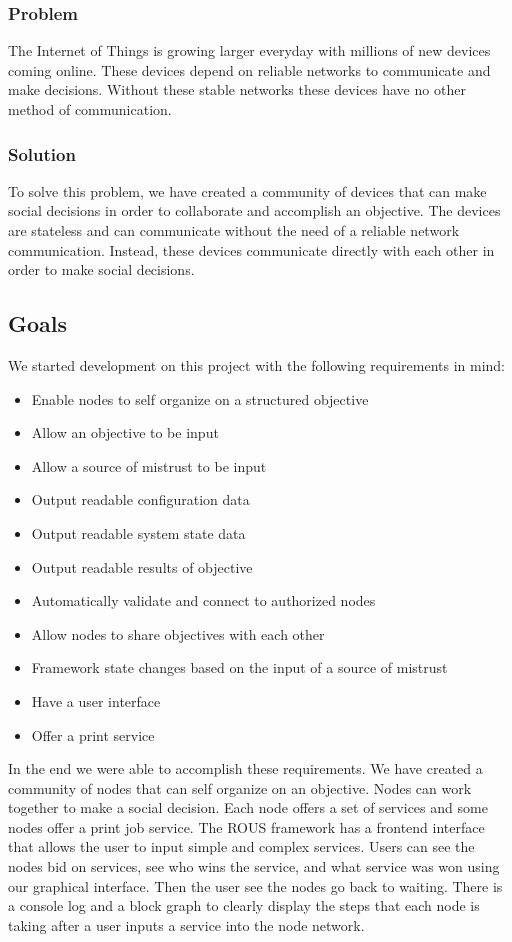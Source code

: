 \documentclass[draftclsnofoot, onecolumn, compsoc, 10pt]{IEEEtran}
\begin{document}
\subsubsection{Problem}
The Internet of Things is growing larger everyday with millions of new devices coming online. These devices depend on reliable networks to communicate and make decisions. Without these stable networks these devices have no other method of communication.

\subsubsection{Solution}
To solve this problem, we have created a community of devices that can make social decisions in order to collaborate and accomplish an objective. The devices are stateless and can communicate without the need of a reliable network communication. Instead, these devices communicate directly with each other in order to make social decisions.

\subsection{Goals}

We started development on this project with the following requirements in mind:
\begin{itemize}
\item Enable nodes to self organize on a structured objective
\item Allow an objective to be input
\item Allow a source of mistrust to be input
\item Output readable configuration data
\item Output readable system state data
\item Output readable results of objective
\item Automatically validate and connect to authorized nodes
\item Allow nodes to share objectives with each other
\item Framework state changes based on the input of a source of mistrust
\item Have a user interface
\item Offer a print service
\end{itemize}
In the end we were able to accomplish these requirements. We have created a community of nodes that can self organize on an objective. Nodes can work together to make a social decision. Each node offers a set of services and some nodes offer a print job service. The ROUS framework has a frontend interface that allows the user to input simple and complex services. Users can see the nodes bid on services, see who wins the service, and what service was won using our graphical interface. Then the user see the nodes go back to waiting. There is a console log and a block graph to clearly display the steps that each node is taking after a user inputs a service into the node network.
\end{document}
